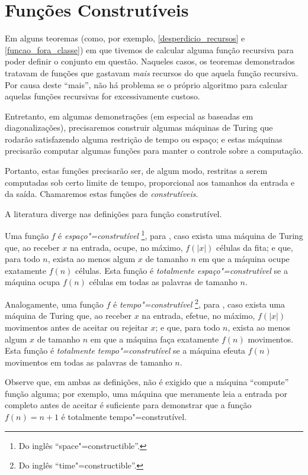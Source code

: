 \section{Funções Construtíveis}

Em alguns teoremas
(como, por exemplo, \ref{desperdicio_recursos} e \ref{funcao_fora_classe})
em que tivemos de calcular alguma função recursiva
para poder definir o conjunto em questão.
Naqueles casos,
os teoremas demonstrados tratavam de funções
que gastavam \emph{mais} recursos do que aquela função recursiva.
Por causa deste ``mais'',
não há problema
se o próprio algoritmo para calcular aquelas funções recursivas
for excessivamente custoso.

Entretanto,
em algumas demonstrações
(em especial as baseadas em diagonalizações),
precisaremos construir algumas máquinas de Turing
que rodarão satisfazendo alguma restrição de tempo ou espaço;
e estas máquinas precisarão computar algumas funções
para manter o controle sobre a computação.

Portanto,
estas funções precisarão ser,
de algum modo,
restritas a serem computadas sob certo limite de tempo,
proporcional aos tamanhos da entrada e da saída.
Chamaremos estas funções de \emph{construtíveis}.

A literatura diverge nas definições para função construtível.

Uma função $f$ é \emph{espaço"=construtível}
\footnote{
    Do inglês ``space"=constructible''.
}, para
,
caso exista uma máquina de Turing que,
ao receber $x$ na entrada,
ocupe, no máximo, $f(|x|)$ células da fita;
e que, para todo $n$, exista ao menos algum $x$ de tamanho $n$
em que a máquina ocupe exatamente $f(n)$ células.
Esta função é \emph{totalmente espaço"=construtível}
se a máquina ocupa $f(n)$ células em todas as palavras de tamanho $n$.

Analogamente, uma função $f$ é \emph{tempo"=construtível}
\footnote{
    Do inglês ``time"=constructible''.
}, para
,
caso exista uma máquina de Turing que,
ao receber $x$ na entrada,
efetue, no máximo, $f(|x|)$ movimentos antes de aceitar ou rejeitar $x$;
e que, para todo $n$, exista ao menos algum $x$ de tamanho $n$
em que a máquina faça exatamente $f(n)$ movimentos.
Esta função é \emph{totalmente tempo"=construtível}
se a máquina efeuta $f(n)$ movimentos em todas as palavras de tamanho $n$.

Observe que,
em ambas as definições,
não é exigido que a máquina ``compute'' função alguma;
por exemplo,
uma máquina que meramente leia a entrada por completo antes de aceitar
é suficiente para demonstrar que a função $f(n) = n+1$
é totalmente tempo"=construtível.

